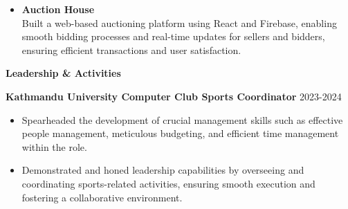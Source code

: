 \documentclass[11pt]{article}
\begin{document}
\begin{itemize}[noitemsep]
    \item {\Large\textbf{Auction House}}\\
             Built a web-based auctioning platform using React and Firebase, enabling smooth bidding processes and real-time updates for sellers and bidders, ensuring efficient transactions and user satisfaction.
             \\

    \clearpage
           
          
\end{itemize} 






\vspace{-10pt}
\begin{center}
    {\Huge\textbf{Leadership \& Activities}}
\end{center}
\vspace{-15pt}
\hrulefill
\vspace{3pt}


{\Large\textbf{Kathmandu University Computer Club Sports Coordinator}} \hfill 2023-2024
\begin{itemize}[noitemsep]
    \item Spearheaded the development of crucial management skills such as effective people management, meticulous budgeting, and efficient time management within the role.
    
    \item Demonstrated and honed leadership capabilities by overseeing and coordinating sports-related activities, ensuring smooth execution and fostering a collaborative environment.
\end{itemize} 
\end{document}
